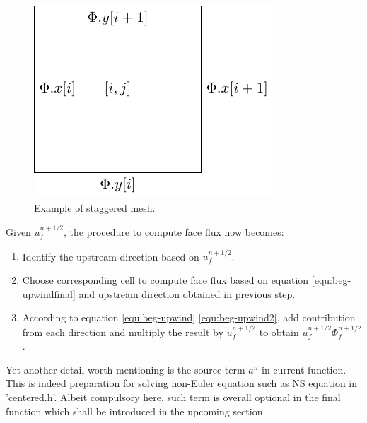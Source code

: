 \begin{figure}[H]
     \centering
     \includegraphics{image/bcg-h/staggered.pdf}
     \caption{Example of staggered mesh.}
     \label{fig:bcg-staggered}
\end{figure}
Given $u_f^{n+1/2}$, the procedure to compute face flux now becomes:
\begin{enumerate}
    \item Identify the upstream direction based on $u_f^{n+1/2}$.
    \item Choose corresponding cell to compute face flux based on equation \ref{equ:beg-upwindfinal} and upstream direction obtained in previous step.
    \item According to equation \ref{equ:beg-upwind} \ref{equ:beg-upwind2}, add contribution from each direction and multiply the result by $u_f^{n+1/2}$ to obtain $u_f^{n+1/2}\Phi_f^{n+1/2}$.
\end{enumerate}
Yet another detail worth mentioning is the source term $a^n$ in current function. This is indeed preparation for solving non-Euler equation such as NS equation in 'centered.h'. Albeit compulsory here, such term is overall optional in the final function  which shall be introduced in the upcoming section.

